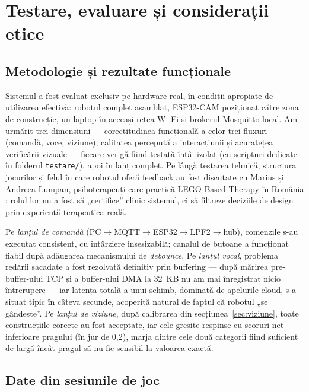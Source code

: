 \chapter{Testare, evaluare și considerații etice}
\label{cap:evaluare}

\section{Metodologie și rezultate funcționale}

Sistemul a fost evaluat exclusiv pe hardware real, în condiții apropiate de utilizarea efectivă: robotul complet asamblat, ESP32-CAM poziționat către zona de construcție, un laptop în aceeași rețea Wi-Fi și brokerul Mosquitto local. Am urmărit trei dimensiuni — corectitudinea funcțională a celor trei fluxuri (comandă, voce, viziune), calitatea percepută a interacțiunii și acuratețea verificării vizuale — fiecare verigă fiind testată întâi izolat (cu scripturi dedicate în folderul \texttt{testare/}), apoi în lanț complet. Pe lângă testarea tehnică, structura jocurilor și felul în care robotul oferă feedback au fost discutate cu Marius și Andreea Lumpan, psihoterapeuți care practică LEGO-Based Therapy în România \cite{lumpanagerpres2025}; rolul lor nu a fost să „certifice” clinic sistemul, ci să filtreze deciziile de design prin experiență terapeutică reală.

Pe \emph{lanțul de comandă} (PC$\rightarrow$MQTT$\rightarrow$ESP32$\rightarrow$LPF2$\rightarrow$hub), comenzile s-au executat consistent, cu întârziere insesizabilă; canalul de butoane a funcționat fiabil după adăugarea mecanismului de \emph{debounce}. Pe \emph{lanțul vocal}, problema redării sacadate a fost rezolvată definitiv prin buffering — după mărirea pre-buffer-ului TCP și a buffer-ului DMA la 32~KB nu am mai înregistrat nicio întrerupere — iar latența totală a unui schimb, dominată de apelurile cloud, s-a situat tipic în câteva secunde, acoperită natural de faptul că robotul „se gândește”. Pe \emph{lanțul de viziune}, după calibrarea din secțiunea~\ref{sec:viziune}, toate construcțiile corecte au fost acceptate, iar cele greșite respinse cu scoruri net inferioare pragului (în jur de 0,2), marja dintre cele două categorii fiind suficient de largă încât pragul să nu fie sensibil la valoarea exactă.

\section{Date din sesiunile de joc}

